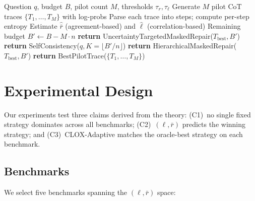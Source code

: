 \documentclass{article}
\begin{document}
\begin{algorithm}[t]
\caption{CLOX-Adaptive Inference}
\label{alg:clox}
\begin{algorithmic}[1]
\REQUIRE Question $q$, budget $B$, pilot count $M$, thresholds $\tau_r, \tau_\ell$
\STATE Generate $M$ pilot CoT traces $\{T_1, \ldots, T_M\}$ with log-probs
\STATE Parse each trace into steps; compute per-step entropy
\STATE Estimate $\hat{\bar{r}}$ (agreement-based) and $\hat{\ell}$ (correlation-based)
\STATE Remaining budget $B' \leftarrow B - M \cdot n$
    \STATE \textbf{return} UncertaintyTargetedMaskedRepair($T_{\text{best}}, B'$)
    \STATE \textbf{return} SelfConsistency($q, K = \lfloor B'/n \rfloor$)
    \STATE \textbf{return} HierarchicalMaskedRepair($T_{\text{best}}, B'$)
\ELSE
    \STATE \textbf{return} BestPilotTrace($\{T_1, \ldots, T_M\}$)
\ENDIF
\end{algorithmic}
\end{algorithm}

\section{Experimental Design}
\label{sec:experiments}

Our experiments test three claims derived from the theory: (C1)~no single fixed strategy dominates across all benchmarks; (C2)~$(\ell, \bar{r})$ predicts the winning strategy; and (C3)~CLOX-Adaptive matches the oracle-best strategy on each benchmark.

\subsection{Benchmarks}

We select five benchmarks spanning the $(\ell, \bar{r})$ space:
\end{document}
